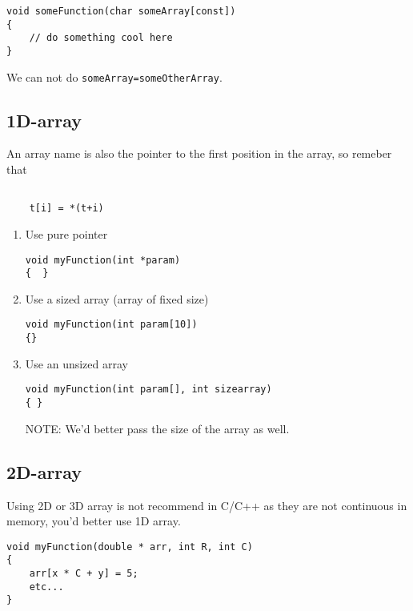 \begin{Verbatim}
void someFunction(char someArray[const])
{
    // do something cool here
}
\end{Verbatim}
We can not do \verb!someArray=someOtherArray!.

\subsection{1D-array}

An array name is also the pointer to the first position in the array, so remeber
that 
\begin{verbatim}

    t[i] = *(t+i)

\end{verbatim}

\begin{enumerate}
  \item Use pure pointer
\begin{verbatim}
void myFunction(int *param)
{  }
\end{verbatim}

  \item Use a sized array (array of fixed size)
\begin{verbatim}
void myFunction(int param[10])
{}
\end{verbatim}

  \item Use an unsized array
\begin{verbatim}
void myFunction(int param[], int sizearray)
{ }
\end{verbatim}
NOTE: We'd better pass the size of the array as well.

\end{enumerate}

\subsection{2D-array}

Using 2D or 3D array is not recommend in C/C++ as they are not continuous in
memory, you'd better use 1D array. 
\begin{verbatim}
void myFunction(double * arr, int R, int C)
{
    arr[x * C + y] = 5;
    etc...
}
\end{verbatim}


